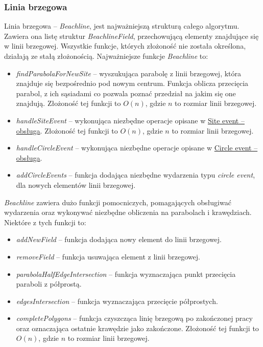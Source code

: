 \documentclass[declaration,shortabstract, inz]{iithesis}
\theoremstyle{definition} \newtheorem{definition}{Definicja}[]
\theoremstyle{plain} \newtheorem{remark}[definition]{Obserwacja}
\theoremstyle{plain} \newtheorem{theorem}[definition]{Twierdzenie}
\theoremstyle{plain} \newtheorem{example}{Przykład}[definition]
\theoremstyle{plain} \newtheorem{lemma}[definition]{Lemat}
\begin{document}
\subsubsection{Linia brzegowa}
Linia brzegowa -- \textit{Beachline}, jest najważniejszą strukturą całego algorytmu. Zawiera ona listę struktur \textit{BeachlineField}, przechowującą elementy znajdujące się w linii brzegowej. Wszystkie funkcje, których złożoność nie została określona, działają ze stałą złożonością. Najważniejsze funkcje \textit{Beachline} to:

\begin{itemize}
\item \textit{findParabolaForNewSite} -- wyszukująca parabolę z linii brzegowej, która znajduje się bezpośrednio pod nowym centrum. Funkcja oblicza przecięcia parabol, z ich sąsiadami co pozwala poznać przedział na jakim się one znajdują. Złożoność tej funkcji to $O(n)$, gdzie $n$ to rozmiar linii brzegowej.

\item \textit{handleSiteEvent} -- wykonująca niezbędne operacje opisane w \hyperref[sec:site]{Site event -- obsługa}. Złożoność tej funkcji to $O(n)$, gdzie $n$ to rozmiar linii brzegowej.

\item \textit{handleCircleEvent} -- wykonująca niezbędne operacje opisane w \hyperref[sec:circle]{Circle event -- obsługa}.

\item \textit{addCircleEvents} -- funkcja dodająca niezbędne wydarzenia typu \textit{circle event}, dla nowych elementów linii brzegowej.
\end{itemize}

\textit{Beachline} zawiera dużo funkcji pomocniczych, pomagających obsługiwać wydarzenia oraz wykonywać niezbędne obliczenia na parabolach i krawędziach. Niektóre z tych funkcji to:

\begin{itemize}
\item \textit{addNewField} -- funkcja dodająca nowy element do linii brzegowej.
\item \textit{removeField} -- funkcja usuwająca element z linii brzegowej.
\item \textit{parabolaHalfEdgeIntersection} -- funkcja wyznaczająca punkt przecięcia paraboli z półprostą.
\item \textit{edgesIntersection} -- funkcja wyznaczająca przecięcie półprostych.
\item \textit{completePolygons} -- funkcja czyszcząca linię brzegową po zakończonej pracy oraz oznaczająca ostatnie krawędzie jako zakończone. Złożoność tej funkcji to $O(n)$, gdzie $n$ to rozmiar linii brzegowej.
\end{itemize}
\end{document}
